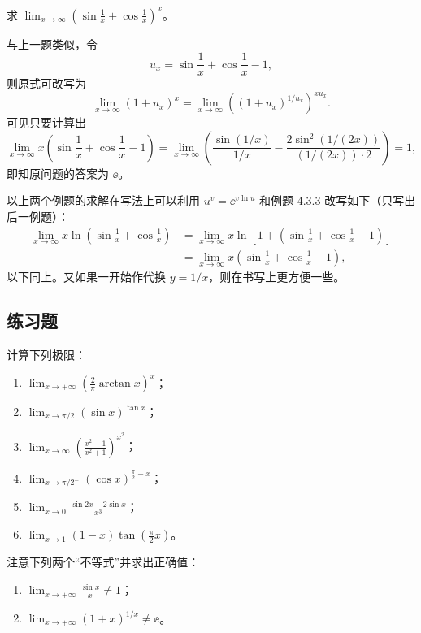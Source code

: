 \begin{xexample}[4.3.5]
求 $\displaystyle\lim_{x\to\infty}\left(\sin\frac1x+\cos\frac1x\right)^x$。
\end{xexample}
\begin{xsolution}
与上一题类似，令
\[
  u_x=\sin\frac1x+\cos\frac1x-1,
\]
则原式可改写为
\[
  \lim_{x\to\infty}(1+u_x)^x
  =\lim_{x\to\infty}\left((1+u_x)^{1/u_x}\right)^{xu_x}.
\]
可见只要计算出
\[
  \lim_{x\to\infty}x\left(\sin\frac1x+\cos\frac1x-1\right)
  =\lim_{x\to\infty}\left(\frac{\sin(1/x)}{1/x}-\frac{2\sin^2(1/(2x))}{(1/(2x))\cdot2}\right)=1,
\]
即知原问题的答案为 $\ee$。
\end{xsolution}

\begin{xremark}
以上两个例题的求解在写法上可以利用 $u^v=\ee^{v\ln u}$ 和例题 4.3.3 改写如下（只写出后一例题）：
\begin{align*}
  \lim_{x\to\infty}x\ln\left(\sin\frac1x+\cos\frac1x\right)
  &=\lim_{x\to\infty}x\ln\left[1+\left(\sin\frac1x+\cos\frac1x-1\right)\right]\\
  &=\lim_{x\to\infty}x\left(\sin\frac1x+\cos\frac1x-1\right),
\end{align*}
以下同上。又如果一开始作代换 $y=1/x$，则在书写上更方便一些。
\end{xremark}

\subsection{练习题}

\begin{xexercise}[1]
计算下列极限：
  \begin{enumerate}
    \item $\displaystyle\lim_{x\to+\infty}\left(\frac2\pi\arctan x\right)^x$；
    \item $\displaystyle\lim_{x\to\pi/2}(\sin x)^{\tan x}$；
    \item $\displaystyle\lim_{x\to\infty}\left(\frac{x^2-1}{x^2+1}\right)^{x^2}$；
    \item $\displaystyle\lim_{x\to\pi/2^-}(\cos x)^{\frac\pi2-x}$；
    \item $\displaystyle\lim_{x\to0}\frac{\sin2x-2\sin x}{x^3}$；
    \item $\displaystyle\lim_{x\to1}(1-x)\tan\left(\frac\pi2x\right)$。
  \end{enumerate}
\end{xexercise}

\begin{xexercise}[2]
注意下列两个“不等式”并求出正确值：
  \begin{enumerate}
    \item $\displaystyle\lim_{x\to+\infty}\frac{\sin x}{x}\ne1$；
    \item $\displaystyle\lim_{x\to+\infty}(1+x)^{1/x}\ne\ee$。
  \end{enumerate}
\end{xexercise}

